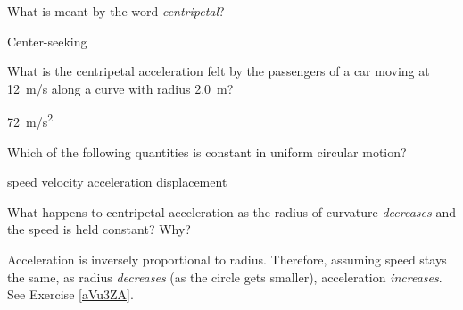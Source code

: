 \documentclass[../main-physics-workbook.tex]{subfiles}
\begin{document}
\begin{questions}
\question \label{x2YCzr} %
What is meant by the word \textit{centripetal}?

\begin{solution}
Center-seeking
\end{solution}


\question \label{S4rGIt} %




\question \label{kTvEZX} %
What is the centripetal acceleration felt by the passengers of a car moving at \SI{12}{m/s} along a curve with radius \SI{2.0}{m}?

\begin{solution}
\SI{72}{m/s^2}
\end{solution}




\question \label{fsjtBV} %
Which of the following quantities is constant in uniform circular motion?

\begin{randomizechoices}
    \correctchoice speed
    \choice velocity
    \choice acceleration
    \choice displacement    
\end{randomizechoices}







\question \label{5lauZ6} %
What happens to centripetal acceleration as the radius of curvature \textit{decreases} and the speed is held constant? Why?

\begin{solution}
Acceleration is inversely proportional to radius. Therefore, assuming speed stays the same, as radius \textit{decreases} (as the circle gets smaller), acceleration \textit{increases}. See Exercise \ref{aVu3ZA}.
\end{solution}



\end{questions}
\end{document}
